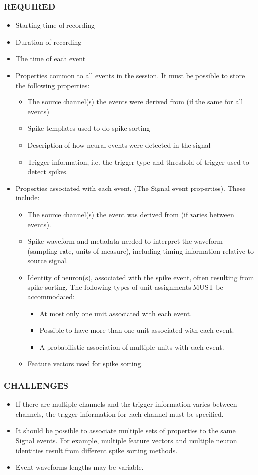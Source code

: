 \documentclass[letterpaper, 10 pt, conference]{ieeeconf}  \IEEEoverridecommandlockouts                              \overrideIEEEmargins
\begin{document}
\subsubsection*{REQUIRED}
\begin{itemize}
\item Starting time of recording
\item Duration of recording
\item The time of each event
\item Properties common to all events in the session.  It must be possible to store the following properties:
 \begin{itemize}
 \item The source channel(s) the events were derived from (if the same for all events)
 \item Spike templates used to do spike sorting
 \item Description of how neural events were detected in the signal
 \item Trigger information, i.e. the trigger type and threshold of trigger used to detect spikes.  
 \end{itemize}
\item Properties associated with each event. (The Signal event properties).  These include:
 \begin{itemize}
 \item The source channel(s) the event was derived from (if varies between events).
 \item Spike waveform and metadata needed to interpret the waveform (sampling rate, units of measure), including timing information relative to source signal.
 \item Identity of neuron(s), associated with the spike event, often resulting from spike sorting.  The following types of unit assignments MUST be accommodated:
  \begin{itemize}
  \item At most only one unit associated with each event.
  \item Possible to have more than one unit associated with each event.
  \item A probabilistic association of multiple units with each event.
  \end{itemize}
 \item Feature vectors used for spike sorting.
 \end{itemize}
\end{itemize}
\smallskip
\subsubsection*{CHALLENGES}
\begin{itemize}
\item If there are multiple channels and the trigger information varies between channels, the trigger information for each channel must be specified.
\item It should be possible to associate multiple sets of properties to the same Signal events.  For example, multiple feature vectors and multiple neuron identities result from different spike sorting methods.
\item Event waveforms lengths may be variable.
\end{itemize}
\end{document}
